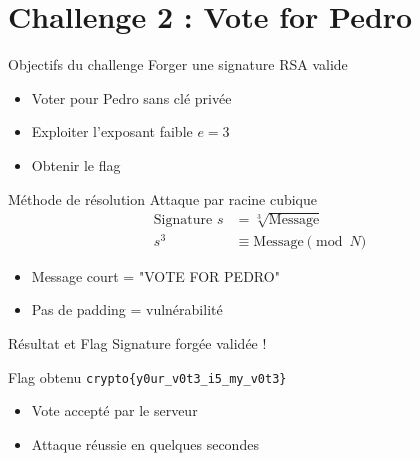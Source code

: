 
\section{Challenge 2 : Vote for Pedro}

\begin{frame}{Objectifs du challenge}
\centering
{\LARGE Forger une signature RSA valide}\\
\vspace{1cm}
\begin{itemize}
    \item Voter pour Pedro sans clé privée
    \item Exploiter l'exposant faible $e = 3$
    \item Obtenir le flag
\end{itemize}
\end{frame}

\begin{frame}{Méthode de résolution}
\centering
{\LARGE Attaque par racine cubique}
\vspace{0.5cm}
\begin{align*}
\text{Signature } s &= \sqrt[3]{\text{Message}} \\
s^3 &\equiv \text{Message} \pmod{N}
\end{align*}
\begin{itemize}
    \item Message court = "VOTE FOR PEDRO"
    \item Pas de padding = vulnérabilité
\end{itemize}
\end{frame}

\begin{frame}{Résultat et Flag}
\centering
{\LARGE Signature forgée validée !}
\vspace{1cm}
\begin{block}{Flag obtenu}
\texttt{crypto\{y0ur\_v0t3\_i5\_my\_v0t3\}}
\end{block}
\begin{itemize}
    \item Vote accepté par le serveur
    \item Attaque réussie en quelques secondes
\end{itemize}
\end{frame}
